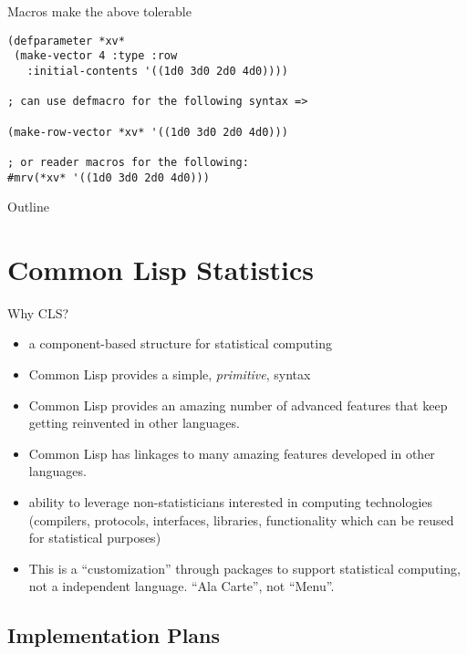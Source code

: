 \documentclass{beamer}
\begin{document}
\begin{frame}[fragile]{Macros make the above tolerable}
\begin{verbatim}
(defparameter *xv*
 (make-vector 4 :type :row 
   :initial-contents '((1d0 3d0 2d0 4d0))))

; can use defmacro for the following syntax =>

(make-row-vector *xv* '((1d0 3d0 2d0 4d0)))

; or reader macros for the following:
#mrv(*xv* '((1d0 3d0 2d0 4d0)))
\end{verbatim}
\end{frame}

\begin{frame}{Outline}
  \tableofcontents
\end{frame}

\section{Common Lisp Statistics}
\label{sec:CLS}

\begin{frame}{Why CLS?}
  \begin{itemize}
  \item a component-based structure for statistical computing
  \item Common Lisp provides a simple, \emph{primitive}, syntax
  \item Common Lisp provides an amazing number of advanced features
    that keep getting reinvented in other languages.
  \item Common Lisp has linkages to many amazing features developed in
    other languages.
  \item ability to leverage non-statisticians interested in computing
    technologies (compilers, protocols, interfaces, libraries,
    functionality which can be reused for statistical purposes)
  \item This is a ``customization'' through packages to support
    statistical computing, not a independent language.  ``Ala Carte'',
    not ``Menu''.
  \end{itemize}
\end{frame}

\subsection{Implementation Plans}
\label{sec:CLS:impl}
\end{document}
